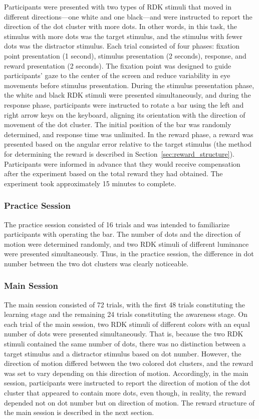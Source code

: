 \documentclass[dvipdfmx]{article}
\begin{document}
Participants were presented with two types of RDK stimuli that moved in different directions—one white and one black—and were instructed to report the direction of the dot cluster with more dots.
In other words, in this task, the stimulus with more dots was the target stimulus, and the stimulus with fewer dots was the distractor stimulus.
Each trial consisted of four phases: fixation point presentation (1 second), stimulus presentation (2 seconds), response, and reward presentation (2 seconds).
The fixation point was designed to guide participants' gaze to the center of the screen and reduce variability in eye movements before stimulus presentation.
During the stimulus presentation phase, the white and black RDK stimuli were presented simultaneously,
and during the response phase, participants were instructed to rotate a bar using the left and right arrow keys on the keyboard,
aligning its orientation with the direction of movement of the dot cluster.
The initial position of the bar was randomly determined, and response time was unlimited.
In the reward phase, a reward was presented based on the angular error relative to the target stimulus
(the method for determining the reward is described in Section~\ref{sec:reward_structure}).
Participants were informed in advance that they would receive compensation after the experiment based on the total reward they had obtained.
The experiment took approximately 15 minutes to complete.

\subsubsection{Practice Session}
The practice session consisted of 16 trials and was intended to familiarize participants with operating the bar.
The number of dots and the direction of motion were determined randomly, and two RDK stimuli of different luminance were presented simultaneously.
Thus, in the practice session, the difference in dot number between the two dot clusters was clearly noticeable.

\subsubsection{Main Session}
The main session consisted of 72 trials, with the first 48 trials constituting the learning stage and the remaining 24 trials constituting the awareness stage.
On each trial of the main session, two RDK stimuli of different colors with an equal number of dots were presented simultaneously.
That is, because the two RDK stimuli contained the same number of dots, there was no distinction between a target stimulus and a distractor stimulus based on dot number.
However, the direction of motion differed between the two colored dot clusters, and the reward was set to vary depending on this direction of motion.
Accordingly, in the main session, participants were instructed to report the direction of motion of the dot cluster that appeared to contain more dots, even though, in reality, the reward depended not on dot number but on direction of motion.
The reward structure of the main session is described in the next section.
\end{document}
